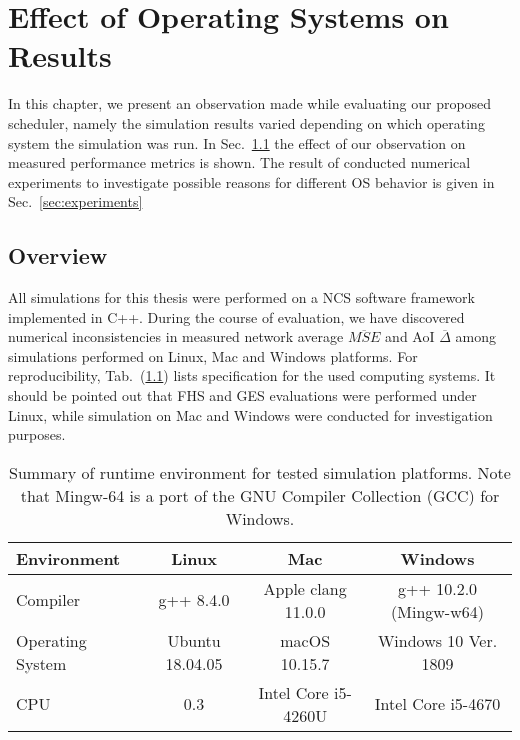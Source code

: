\chapter{Effect of Operating Systems on Results}

In this chapter, we present an observation made while evaluating our proposed
scheduler, namely the simulation results varied depending on which operating
system the simulation was run. In Sec.~\ref{sec:effect} the effect of our
observation on measured performance metrics is shown. The result of conducted
numerical experiments to investigate possible reasons for different OS behavior
is given in Sec.~\ref{sec:experiments}

\section{Overview} \label{sec:effect}

All simulations for this thesis were performed on a NCS software framework
implemented in C++\footnotemark. During the course of evaluation, we have
discovered numerical inconsistencies in measured network average
$\overline{MSE}$ and AoI $\overline{\Delta}$ among simulations performed on
Linux, Mac and Windows platforms. For reproducibility, Tab.~(\ref{tab:specs})
lists specification for the used computing systems. It should be pointed out
that FHS and GES evaluations were performed under Linux, while simulation on Mac
and Windows were conducted for investigation purposes.

\begin{table}[b]
  \begin{center}
  \begin{tabular}{|l|c|c|c|} 
  \hline
  \textbf{Environment} & \textbf{Linux} & \textbf{Mac} & \textbf{Windows} \\
  \hline \hline
  Compiler & g++ 8.4.0 & Apple clang 11.0.0 & g++ 10.2.0 (Mingw-w64) \\ 
  Operating System & Ubuntu 18.04.05 & macOS 10.15.7 & Windows 10 Ver. 1809 \\ 
  CPU & 0.3 & Intel Core i5-4260U & Intel Core i5-4670 \\
  \hline
  \end{tabular}
  \end{center}
  \caption[Summary of runtime environment for tested simulation
  platforms]{Summary of runtime environment for tested simulation platforms.
  Note that Mingw-64 is a port of the GNU Compiler Collection (GCC) for
  Windows.}
  \label{tab:specs}
\end{table}

